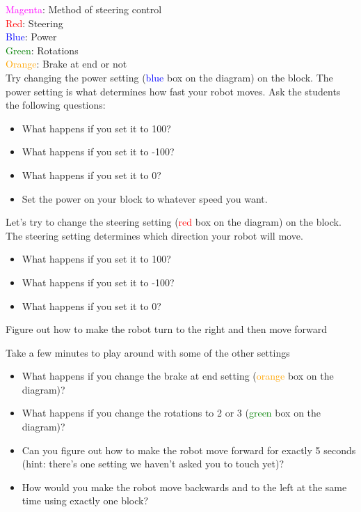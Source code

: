 \documentclass{lessonplan}
\begin{document}
    \textcolor{magenta}{Magenta}: Method of steering control \hfill \\
    \textcolor{red}{Red}: Steering  \hfill \\
    \textcolor{blue}{Blue}: Power  \hfill \\
    \textcolor{green}{Green}: Rotations  \hfill \\
    \textcolor{orange}{Orange}: Brake at end or not  \hfill \\

    Try changing the power setting (\textcolor{blue}{blue} box on the diagram) on the block.
    The power setting is what determines how fast your robot moves. Ask the students the following questions:
    \begin{itemize}
        \item What happens if you set it to 100?
        \item What happens if you set it to -100?
        \item What happens if you set it to 0?
        \item Set the power on your block to whatever speed you want.
    \end{itemize}
    \par
    Let’s try to change the steering setting (\textcolor{red}{red} box on the diagram) on the block.
    The steering setting determines which direction your robot will move.
    \begin{itemize}
        \item What happens if you set it to 100?
        \item What happens if you set it to -100?
        \item What happens if you set it to 0?
    \end{itemize}
    \par
    Figure out how to make the robot turn to the right and then move forward
    \par
    Take a few minutes to play around with some of the other settings
    \begin{itemize}
        \item What happens if you change the brake at end setting (\textcolor{orange}{orange} box on the diagram)?
        \item What happens if you change the rotations to 2 or 3 (\textcolor{green}{green} box on the diagram)?
        \item Can you figure out how to make the robot move forward for exactly 5 seconds (hint: there’s one setting we haven’t asked you to touch yet)?
        \item  How would you make the robot move backwards and to the left at the same time using exactly one block?
    \end{itemize}
    
\end{document}
